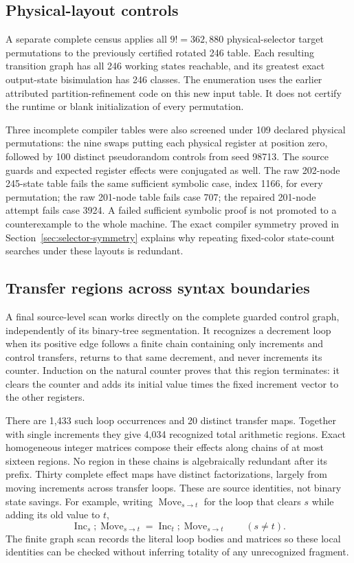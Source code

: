\subsection{Physical-layout controls}

A separate complete census applies all $9!=362,880$ physical-selector
target permutations to the previously certified rotated 246 table.
Each resulting transition graph has all 246 working states reachable,
and its greatest exact output-state bisimulation has 246 classes.
The enumeration uses the earlier attributed partition-refinement code
on this new input table. It does not certify the runtime or blank
initialization of every permutation.

Three incomplete compiler tables were also screened under 109 declared
physical permutations: the nine swaps putting each physical register
at position zero, followed by 100 distinct pseudorandom controls from
seed 98713. The source guards and expected register effects were
conjugated as well. The raw 202-node 245-state table fails the same
sufficient symbolic case, index 1166, for every permutation; the raw
201-node table fails case 707; the repaired 201-node attempt fails
case 3924. A failed sufficient symbolic proof is not promoted to a
counterexample to the whole machine. The exact compiler symmetry proved
in Section~\ref{sec:selector-symmetry} explains why repeating fixed-color
state-count searches under these layouts is redundant.

\subsection{Transfer regions across syntax boundaries}

A final source-level scan works directly on the complete guarded control
graph, independently of its binary-tree segmentation. It recognizes a
decrement loop when its positive edge follows a finite chain containing
only increments and control transfers, returns to that same decrement,
and never increments its counter. Induction on the natural counter proves
that this region terminates: it clears the counter and adds its initial
value times the fixed increment vector to the other registers.

There are 1,433 such loop occurrences and 20 distinct transfer maps.
Together with single increments they give 4,034 recognized total arithmetic
regions. Exact homogeneous integer matrices compose their effects along
chains of at most sixteen regions. No region in these chains is
algebraically redundant after its prefix. Thirty complete effect maps
have distinct factorizations, largely from moving increments across
transfer loops. These are source identities, not binary state savings.
For example, writing $\operatorname{Move}_{s\to t}$ for the loop that
clears $s$ while adding its old value to $t$,
\[
 \operatorname{Inc}_s;\operatorname{Move}_{s\to t}
 =\operatorname{Inc}_t;\operatorname{Move}_{s\to t}
 \qquad(s\ne t).
\]
The finite graph scan records the literal loop bodies and matrices so
these local identities can be checked without inferring totality of any
unrecognized fragment.

